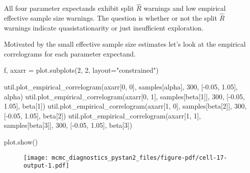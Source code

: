 \documentclass[
  letterpaper,
  DIV=11,
  numbers=noendperiod]{scrartcl}
\newenvironment{Shaded}{\begin{snugshade}}{\end{snugshade}}
\newcommand{\DecValTok}[1]{\textcolor[rgb]{0.68,0.00,0.00}{#1}}
\newcommand{\FloatTok}[1]{\textcolor[rgb]{0.68,0.00,0.00}{#1}}
\newcommand{\NormalTok}[1]{\textcolor[rgb]{0.00,0.23,0.31}{#1}}
\newcommand{\OperatorTok}[1]{\textcolor[rgb]{0.37,0.37,0.37}{#1}}
\newcommand{\StringTok}[1]{\textcolor[rgb]{0.13,0.47,0.30}{#1}}
\begin{document}
All four parameter expectands exhibit split \(\hat{R}\) warnings and low
empirical effective sample size warnings. The question is whether or not
the split \(\hat{R}\) warnings indicate quasistationarity or just
insufficient exploration.

Motivated by the small effective sample size estimates let's look at the
empirical correlograms for each parameter expectand.

\begin{Shaded}
\begin{Highlighting}[]
\NormalTok{f, axarr }\OperatorTok{=}\NormalTok{ plot.subplots(}\DecValTok{2}\NormalTok{, }\DecValTok{2}\NormalTok{, layout}\OperatorTok{=}\StringTok{"constrained"}\NormalTok{)}

\NormalTok{util.plot\_empirical\_correlogram(axarr[}\DecValTok{0}\NormalTok{, }\DecValTok{0}\NormalTok{], samples[}\StringTok{\textquotesingle{}alpha\textquotesingle{}}\NormalTok{], }
                                \DecValTok{300}\NormalTok{, [}\OperatorTok{{-}}\FloatTok{0.05}\NormalTok{, }\FloatTok{1.05}\NormalTok{],  }\StringTok{\textquotesingle{}alpha\textquotesingle{}}\NormalTok{)}
\NormalTok{util.plot\_empirical\_correlogram(axarr[}\DecValTok{0}\NormalTok{, }\DecValTok{1}\NormalTok{], samples[}\StringTok{\textquotesingle{}beta[1]\textquotesingle{}}\NormalTok{], }
                                \DecValTok{300}\NormalTok{, [}\OperatorTok{{-}}\FloatTok{0.05}\NormalTok{, }\FloatTok{1.05}\NormalTok{],  }\StringTok{\textquotesingle{}beta[1]\textquotesingle{}}\NormalTok{)}
\NormalTok{util.plot\_empirical\_correlogram(axarr[}\DecValTok{1}\NormalTok{, }\DecValTok{0}\NormalTok{], samples[}\StringTok{\textquotesingle{}beta[2]\textquotesingle{}}\NormalTok{], }
                                \DecValTok{300}\NormalTok{, [}\OperatorTok{{-}}\FloatTok{0.05}\NormalTok{, }\FloatTok{1.05}\NormalTok{],  }\StringTok{\textquotesingle{}beta[2]\textquotesingle{}}\NormalTok{)}
\NormalTok{util.plot\_empirical\_correlogram(axarr[}\DecValTok{1}\NormalTok{, }\DecValTok{1}\NormalTok{], samples[}\StringTok{\textquotesingle{}beta[3]\textquotesingle{}}\NormalTok{], }
                                \DecValTok{300}\NormalTok{, [}\OperatorTok{{-}}\FloatTok{0.05}\NormalTok{, }\FloatTok{1.05}\NormalTok{],  }\StringTok{\textquotesingle{}beta[3]\textquotesingle{}}\NormalTok{)}

\NormalTok{plot.show()}
\end{Highlighting}
\end{Shaded}

\begin{figure}[H]

{\centering \texttt{[image: mcmc\_diagnostics\_pystan2\_files/figure-pdf/cell-17-output-1.pdf]}

}

\end{figure}
\end{document}
